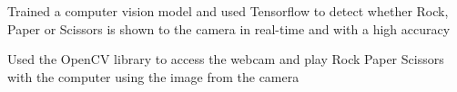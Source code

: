 \documentclass[]{plushcv}
\begin{document}
\begin{minipage}[t]{0.70\textwidth}

\begin{tightemize}
\item Trained a computer vision model and used Tensorflow to detect whether Rock, Paper or Scissors is shown to the camera in real-time and with a high accuracy
\item Used the OpenCV library to access the webcam and play Rock Paper Scissors with the computer using the image from the camera
\end{tightemize}
\sectionsep


%
%

\end{minipage} 
\hfill
\end{document}
